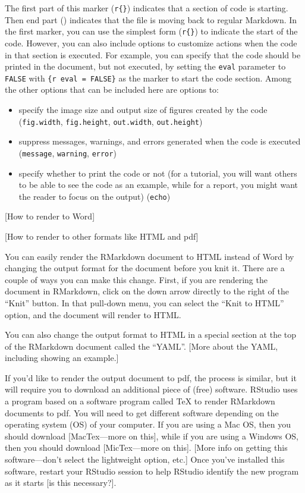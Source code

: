 \documentclass[]{tufte-book}
\providecommand{\tightlist}{%
  \setlength{\itemsep}{0pt}\setlength{\parskip}{0pt}}
\begin{document}
The first part of this marker (\texttt{\textasciigrave{}\textasciigrave{}\textasciigrave{}r\{\}}) indicates that a section of
code is starting. Then end part (\texttt{\textasciigrave{}\textasciigrave{}\textasciigrave{}}) indicates that the file is
moving back to regular Markdown. In the first marker, you can use the simplest
form (\texttt{\textasciigrave{}\textasciigrave{}\textasciigrave{}r\{\}}) to indicate the start of the code. However, you can also
include options to customize actions when the code in that section is executed.
For example, you can specify that the code should be printed in the document,
but not executed, by setting the \texttt{eval} parameter to \texttt{FALSE} with \texttt{\textasciigrave{}\textasciigrave{}\textasciigrave{}\{r\ eval\ =\ FALSE\}} as the marker to start the code section. Among the other
options that can be included here are options to:

\begin{itemize}
\tightlist
\item
  specify the image size and output size of figures created by the code
  (\texttt{fig.width}, \texttt{fig.height}, \texttt{out.width}, \texttt{out.height})
\item
  suppress messages, warnings, and errors generated when the code is
  executed (\texttt{message}, \texttt{warning}, \texttt{error})
\item
  specify whether to print the code or not (for a tutorial, you will want
  others to be able to see the code as an example, while for a report, you
  might want the reader to focus on the output) (\texttt{echo})
\end{itemize}

{[}How to render to Word{]}

{[}How to render to other formats like HTML and pdf{]}

You can easily render the RMarkdown document to HTML instead of Word by
changing the output format for the document before you knit it. There are
a couple of ways you can make this change. First, if you are rendering the
document in RMarkdown, click on the down arrow directly to the right of
the ``Knit'' button. In that pull-down menu, you can select the ``Knit to
HTML'' option, and the document will render to HTML.

You can also change the output format to HTML in a special section at the
top of the RMarkdown document called the ``YAML''. {[}More about the YAML, including
showing an example.{]}

If you'd like to render the output document to pdf, the process is similar, but
it will require you to download an additional piece of (free) software. RStudio
uses a program based on a software program called TeX to render RMarkdown
documents to pdf. You will need to get different software depending on the
operating system (OS) of your computer. If you are using a Mac OS, then you should
download {[}MacTex---more on this{]}, while if you are using a Windows OS, then you
should download {[}MicTex---more on this{]}. {[}More info on getting this software---don't
select the lightweight option, etc.{]} Once you've installed this software, restart
your RStudio session to help RStudio identify the new program as it starts
{[}is this necessary?{]}.
\end{document}
